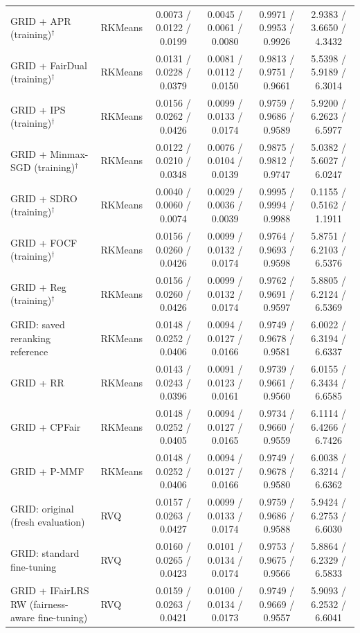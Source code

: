 \begin{table}[p]
{\begin{tabular}{llcccc}
GRID + APR (training)$^{\dagger}$ & RKMeans & 0.0073 / 0.0122 / 0.0199 & 0.0045 / 0.0061 / 0.0080 & 0.9971 / 0.9953 / 0.9926 & 2.9383 / 3.6650 / 4.3432 \\
GRID + FairDual (training)$^{\dagger}$ & RKMeans & 0.0131 / 0.0228 / 0.0379 & 0.0081 / 0.0112 / 0.0150 & 0.9813 / 0.9751 / 0.9661 & 5.5398 / 5.9189 / 6.3014 \\
GRID + IPS (training)$^{\dagger}$ & RKMeans & 0.0156 / 0.0262 / 0.0426 & 0.0099 / 0.0133 / 0.0174 & 0.9759 / 0.9686 / 0.9589 & 5.9200 / 6.2623 / 6.5977 \\
GRID + Minmax-SGD (training)$^{\dagger}$ & RKMeans & 0.0122 / 0.0210 / 0.0348 & 0.0076 / 0.0104 / 0.0139 & 0.9875 / 0.9812 / 0.9747 & 5.0382 / 5.6027 / 6.0247 \\
GRID + SDRO (training)$^{\dagger}$ & RKMeans & 0.0040 / 0.0060 / 0.0074 & 0.0029 / 0.0036 / 0.0039 & 0.9995 / 0.9994 / 0.9988 & 0.1155 / 0.5162 / 1.1911 \\
GRID + FOCF (training)$^{\dagger}$ & RKMeans & 0.0156 / 0.0260 / 0.0426 & 0.0099 / 0.0132 / 0.0174 & 0.9764 / 0.9693 / 0.9598 & 5.8751 / 6.2103 / 6.5376 \\
GRID + Reg (training)$^{\dagger}$ & RKMeans & 0.0156 / 0.0260 / 0.0426 & 0.0099 / 0.0132 / 0.0174 & 0.9762 / 0.9691 / 0.9597 & 5.8805 / 6.2124 / 6.5369 \\
GRID: saved reranking reference & RKMeans & 0.0148 / 0.0252 / 0.0406 & 0.0094 / 0.0127 / 0.0166 & 0.9749 / 0.9678 / 0.9581 & 6.0022 / 6.3194 / 6.6337 \\
GRID + RR & RKMeans & 0.0143 / 0.0243 / 0.0396 & 0.0091 / 0.0123 / 0.0161 & 0.9739 / 0.9661 / 0.9560 & 6.0155 / 6.3434 / 6.6585 \\
GRID + CPFair & RKMeans & 0.0148 / 0.0252 / 0.0405 & 0.0094 / 0.0127 / 0.0165 & 0.9734 / 0.9660 / 0.9559 & 6.1114 / 6.4266 / 6.7426 \\
GRID + P-MMF & RKMeans & 0.0148 / 0.0252 / 0.0406 & 0.0094 / 0.0127 / 0.0166 & 0.9749 / 0.9678 / 0.9580 & 6.0038 / 6.3214 / 6.6362 \\
\midrule
GRID: original (fresh evaluation) & RVQ & 0.0157 / 0.0263 / 0.0427 & 0.0099 / 0.0133 / 0.0174 & 0.9759 / 0.9686 / 0.9588 & 5.9424 / 6.2753 / 6.6030 \\
GRID: standard fine-tuning & RVQ & 0.0160 / 0.0265 / 0.0423 & 0.0101 / 0.0134 / 0.0174 & 0.9753 / 0.9675 / 0.9566 & 5.8864 / 6.2329 / 6.5833 \\
GRID + IFairLRS RW (fairness-aware fine-tuning) & RVQ & 0.0159 / 0.0263 / 0.0421 & 0.0100 / 0.0134 / 0.0173 & 0.9749 / 0.9669 / 0.9557 & 5.9093 / 6.2532 / 6.6041 \\

\end{tabular}}
\end{table}
